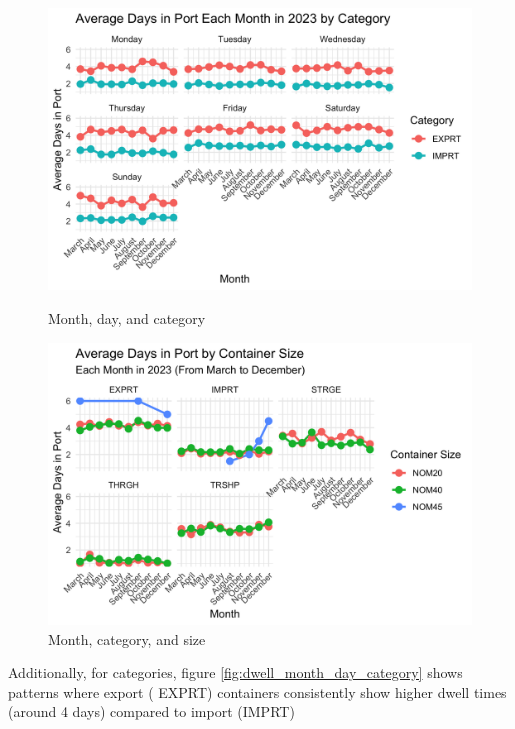 			\begin{figure}[ht]
				\centering
				\begin{minipage}{0.5\textwidth}
					\centering
					\includegraphics[width=\textwidth]{images/du_one}
					\caption{Month, day, and category}
					\label{fig:dwell_month_day_category}
				\end{minipage}%
				\hfill
				\begin{minipage}{0.5\textwidth}
					\centering
					\includegraphics[width=\textwidth]{images/du_six}
					\caption{Month, category, and size}
					\label{fig:dwell_month_category_size}
				\end{minipage}
			\end{figure}
			Additionally, for categories, figure \ref{fig:dwell_month_day_category} shows patterns where export (
			EXPRT) containers consistently show higher dwell times (around 4 days) compared to import (IMPRT)

